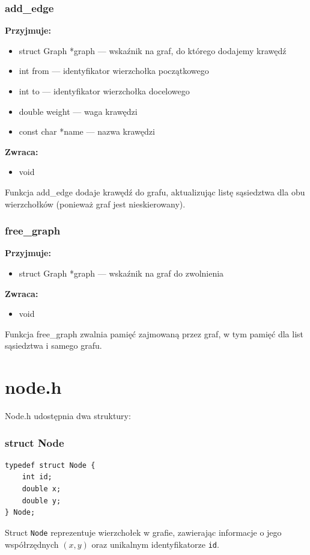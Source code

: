 \documentclass[12pt]{article}
\begin{document}
\subsubsection{add\_edge}
\textbf{Przyjmuje:}
\begin{itemize}
	\item struct Graph *graph --- wskaźnik na graf, do którego dodajemy krawędź
	\item int from --- identyfikator wierzchołka początkowego
	\item int to --- identyfikator wierzchołka docelowego
	\item double weight --- waga krawędzi
	\item const char *name --- nazwa krawędzi
\end{itemize}
\textbf{Zwraca:}
\begin{itemize}
	\item void
\end{itemize}
Funkcja add\_edge dodaje krawędź do grafu, aktualizując listę sąsiedztwa dla obu wierzchołków (ponieważ graf jest nieskierowany).
\subsubsection{free\_graph}
\textbf{Przyjmuje:}
\begin{itemize}
	\item struct Graph *graph --- wskaźnik na graf do zwolnienia
\end{itemize}
\textbf{Zwraca:}
\begin{itemize}
	\item void
\end{itemize}
Funkcja free\_graph zwalnia pamięć zajmowaną przez graf, w tym pamięć dla list
sąsiedztwa i samego grafu.
\section{node.h}
Node.h udostępnia dwa struktury:

\subsubsection{struct Node}
\begin{lstlisting}
typedef struct Node {
    int id;
    double x;
    double y;
} Node;
\end{lstlisting}
Struct \texttt{Node} reprezentuje wierzchołek w grafie, zawierając informacje o jego
współrzędnych $(x, y)$ oraz unikalnym identyfikatorze \texttt{id}.
\end{document}
